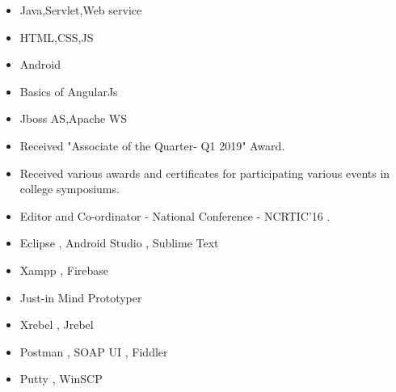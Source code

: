 
\begin{itemize}
\item{Java,Servlet,Web service}%
\item{HTML,CSS,JS}%
\item{Android}%
\item{Basics of AngularJs}%
\item {Jboss AS,Apache WS}
\end{itemize}


\smallskip
\smallskip
\smallskip
{}
\smallskip
\smallskip
\smallskip
{}

\begin{itemize}
    \item Received "Associate of the Quarter- Q1 2019" Award.
    \item Received various awards and certificates for participating various events in college symposiums.
    \item Editor and Co-ordinator - National Conference - NCRTIC'16 .
\end{itemize}

\begin{itemize}
    \item Eclipse , Android Studio , Sublime Text
    \item Xampp , Firebase 
    \item Just-in Mind Prototyper 
    \item Xrebel , Jrebel
    \item Postman , SOAP UI , Fiddler
    \item Putty , WinSCP
    
\end{itemize}

\iffalse
\cvsection{Hobbies}
\begin{itemize}
    \item Watching movies.
    \item Listening songs.
    \item Playing games .
\end{itemize}
\fi

